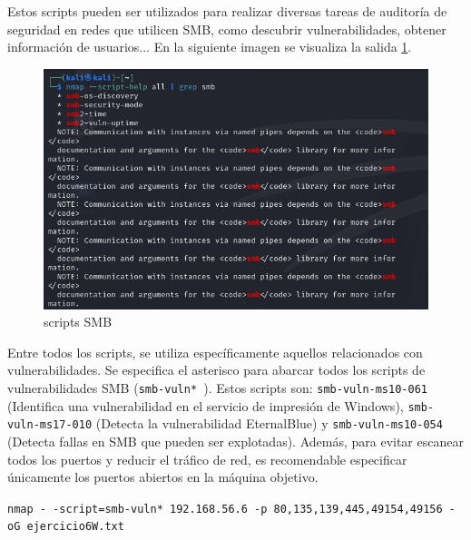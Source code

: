 \documentclass[a4paper,12pt]{article} %
\begin{document}
Estos scripts pueden ser utilizados para realizar diversas tareas de auditoría de seguridad en redes que utilicen SMB, como descubrir vulnerabilidades, obtener información de usuarios... En la siguiente imagen se visualiza la salida \ref{fig:eje6sc}.
\newpage

      \begin{figure} [hp!]
         \centering
         \includegraphics[width=1\textwidth]{Imagenes/ejercicio6.png}
         \caption{scripts SMB }
         \label{fig:eje6sc}
    \end{figure}

Entre todos los scripts, se utiliza específicamente aquellos relacionados con vulnerabilidades. Se especifica el asterisco para abarcar todos los scripts de vulnerabilidades SMB (\texttt{smb-vuln* }). Estos scripts son: \texttt{smb-vuln-ms10-061} (Identifica una vulnerabilidad en el servicio de impresión de Windows), \texttt{smb-vuln-ms17-010} (Detecta la vulnerabilidad EternalBlue) y \texttt{smb-vuln-ms10-054} (Detecta fallas en SMB que pueden ser explotadas). Además, para evitar escanear todos los puertos y reducir el tráfico de red, es recomendable especificar únicamente los puertos abiertos en la máquina objetivo.

    \begin{center}
    \texttt{nmap - -script=smb-vuln* 192.168.56.6 -p 80,135,139,445,49154,49156
    -oG ejercicio6W.txt}
    \end{center}
    
\end{document}
